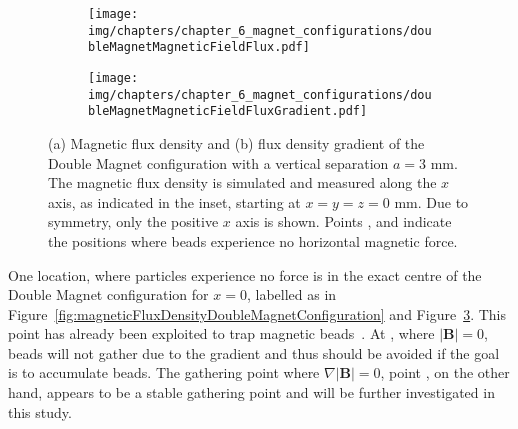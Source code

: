 \begin{figure}[htb]
   \centering
   \begin{subfigure}[b]{0.48\textwidth}
   \texttt{[image: img/chapters/chapter\_6\_magnet\_configurations/doubleMagnetMagneticFieldFlux.pdf]}
   \caption{}
   \label{fig:doubleMagnetMagneticFieldFlux}
   \end{subfigure}
   \hfill
   \begin{subfigure}[b]{0.48\textwidth}
   \texttt{[image: img/chapters/chapter\_6\_magnet\_configurations/doubleMagnetMagneticFieldFluxGradient.pdf]}
   \caption{}
   \label{fig:doubleMagnetMagneticFieldFluxGradient}
   \end{subfigure}
   \caption[Magnetic flux density and flux density gradient of the Double Magnet configuration]{(a) Magnetic flux density and (b) flux density gradient of the Double Magnet configuration with a vertical separation $a=3$ mm. The magnetic flux density is simulated and measured along the $x$ axis, as indicated in the inset, starting at $x=y=z=0$ mm. Due to symmetry, only the positive $x$ axis is shown. Points ,  and  indicate the positions where beads experience no horizontal magnetic force.}
   \label{fig:magneticFluxDensityAndFluxGradientDoubleMagnetConfiguration}
\end{figure}
One location, where particles experience no force is in the exact centre of the Double Magnet configuration for $x=0$, labelled as  in Figure~\ref{fig:magneticFluxDensityDoubleMagnetConfiguration} and Figure~\ref{fig:magneticFluxDensityAndFluxGradientDoubleMagnetConfiguration}. This point has already been exploited to trap magnetic beads~\cite{Gassner2009}. At , where $|\mathbf{B}|=0$, beads will not gather due to the gradient and thus should be avoided if the goal is to accumulate beads. The gathering point where $\nabla|\mathbf{B}|=0$, point , on the other hand, appears to be a stable gathering point and will be further investigated in this study. 

